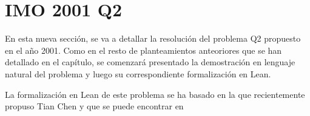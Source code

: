 \section{IMO 2001 Q2}
En esta nueva sección, se va a detallar la resolución del problema
Q2 propuesto en el año 2001. Como en el resto de planteamientos
anteoriores que se han detallado en el capítulo, se comenzará
presentado la demostración en lenguaje natural del problema y
luego su correspondiente formalización en Lean.

La formalización en Lean de este problema se ha basado en la que
recientemente propuso Tian Chen y que se puede  encontrar en
\cite{TCC}